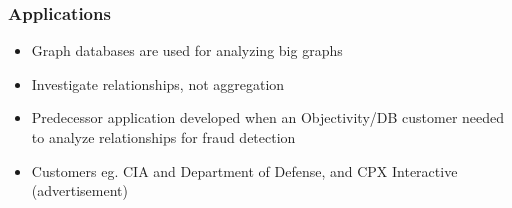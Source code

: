 
\begin{frame}
\frametitle{Applications}
\begin{itemize}
    \item Graph databases are used for analyzing big graphs
    \item Investigate relationships, not aggregation
    \item Predecessor application developed when an Objectivity/DB customer needed to analyze relationships for fraud detection
    \item Customers eg. CIA and Department of Defense, and CPX Interactive (advertisement)
\end{itemize}
\end{frame}